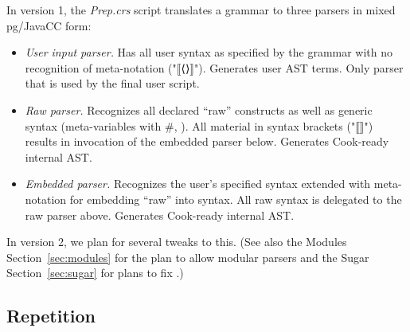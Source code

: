 \documentclass[11pt]{article} %
\begin{document}
In version 1, the \emph{Prep.crs} script translates a grammar to three parsers in mixed pg/JavaCC
form:
\begin{itemize}

\item\emph{User input parser.} Has all user syntax as specified by the grammar with no recognition
  of \HAX meta-notation ("⟦⟨⟩⟧"). Generates user AST terms. Only parser that is used by the final
  user script.

\item\emph{Raw parser.} Recognizes all declared ``raw'' constructs as well as generic \HAX syntax
  (meta-variables with \#, \etc). All material in syntax brackets ("⟦⟧") results in invocation of
  the embedded parser below. Generates Cook-ready internal \HAX AST.

\item\emph{Embedded parser.} Recognizes the user's specified syntax extended with \HAX meta-notation
  for embedding ``raw'' \HAX into syntax. All raw syntax is delegated to the raw parser
  above. Generates Cook-ready internal \HAX AST.

\end{itemize}
In version 2, we plan for several tweaks to this. (See also the Modules Section~\ref{sec:modules}
for the plan to allow modular parsers and the Sugar Section~\ref{sec:sugar} for plans to fix
.)

\subsection{Repetition}
\end{document}
